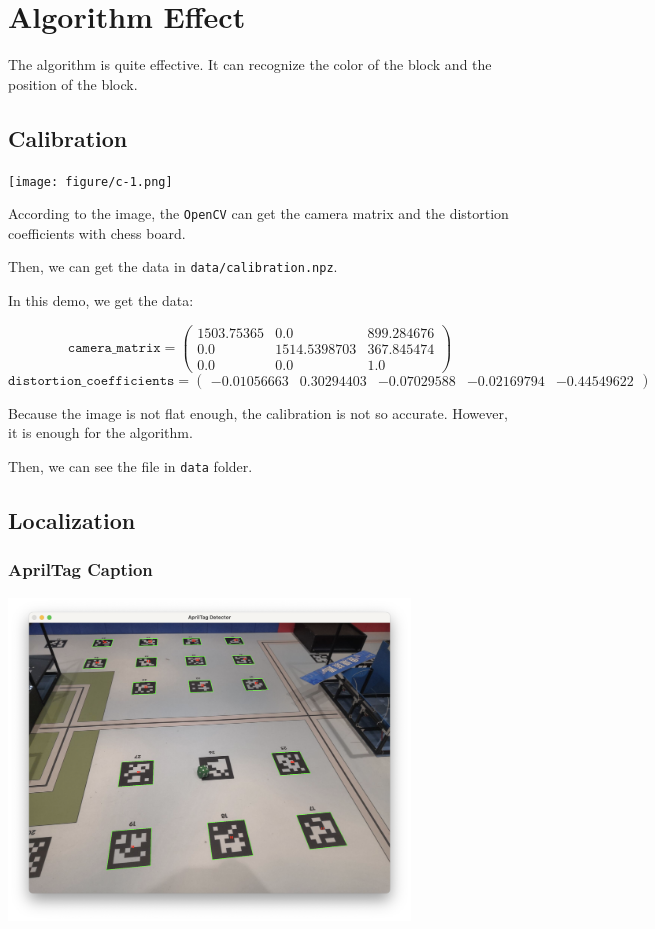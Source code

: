 \documentclass{article}
\begin{document}
\section{Algorithm Effect}

The algorithm is quite effective. It can recognize the color of the block and the position of the block.

\subsection{Calibration}

\texttt{[image: figure/c-1.png]}

According to the image, the \texttt{OpenCV} can get the camera matrix and the distortion coefficients with chess board.

Then, we can get the data in \texttt{data/calibration.npz}.

In this demo, we get the data:

\[
  \texttt{camera\_matrix}=\left(\begin{matrix}
    1503.75365 & 0.0 & 899.284676 \\
    0.0 & 1514.5398703 & 367.845474 \\
    0.0 & 0.0 & 1.0
  \end{matrix}\right)
\]
\[
  \texttt{distortion\_coefficients}=\left(\begin{matrix}
    -0.01056663 & 0.30294403 & -0.07029588 & -0.02169794 & -0.44549622
  \end{matrix}\right)
\]

Because the image is not flat enough, the calibration is not so accurate. However, it is enough for the algorithm.

Then, we can see the file in \texttt{data} folder.

\subsection{Localization}

\subsubsection{AprilTag Caption}

\includegraphics[width=0.8\textwidth]{figure/l-1.png}
\end{document}
